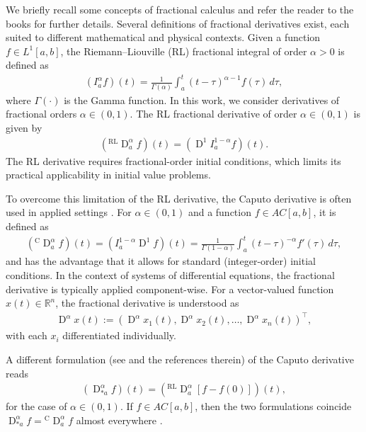 \documentclass{svproc}
\newcommand{\RLderivativeInput}[2]{{}^\mathrm{RL}\operatorname{D}_{#2}^{#1}}
\newcommand{\CderivativeInput}[2]{{}^\mathrm{C}\operatorname{D}_{#2}^{#1}}
\newcommand{\AstderivativeInput}[2]{\operatorname{D}_{\ast #2}^{#1}}
\begin{document}
	{%
		We briefly recall some concepts of fractional calculus and refer the reader to the books \cite{Diethelm2010,Kilbas2006} for further details. Several definitions of fractional derivatives exist, each suited to different mathematical and physical contexts. Given a function $f \in L^1[a,b]$, the Riemann--Liouville (RL) fractional integral of order $\alpha > 0$ is defined as
		\begin{align}
			(I_{a}^\alpha f)(t) = \frac{1}{\Gamma(\alpha)} \int_a^t (t - \tau)^{\alpha - 1} f(\tau)\,d\tau,
		\end{align}
		where $\Gamma(\cdot)$ is the Gamma function. { In this work, we consider derivatives of fractional orders $\alpha \in (0,1)$.} The RL fractional derivative of order $\alpha \in (0,1)$ is given by
		\begin{align}
			\left(\RLderivativeInput{\alpha}{a} f\right)(t) = \left(\operatorname D ^1 {I_{a}^{1 - \alpha}} f\right)(t).
		\end{align} The RL derivative requires fractional-order initial conditions, which limits its practical applicability in initial value problems.
		
		To overcome this limitation of the RL derivative, the Caputo derivative is often used in applied settings \cite{Hinze2020,Rand2010,Daibiri2015}. For $\alpha \in (0, 1)$  and a function $f \in AC[a,b]$, it is defined as
		\begin{align}
			\left(\CderivativeInput{\alpha}{a} f\right)(t) = \left( {I_{a}^{1 - \alpha}}\operatorname D ^1 f\right)(t)= \frac{1}{\Gamma(1 - \alpha)} \int_a^t (t - \tau)^{ - \alpha} f'(\tau)\,d\tau,
		\end{align}
		and has the advantage that it allows for standard (integer-order) initial conditions. In the context of systems of differential equations, the fractional derivative is typically applied component-wise. For a vector-valued function $x(t) \in \mathbb{R}^n$, the fractional derivative is understood as
		\begin{align}
			\operatorname D^\alpha x(t) := \left(\operatorname D^\alpha x_1(t), \operatorname D^\alpha x_2(t), \dots, \operatorname D^\alpha x_n(t)\right)^\top,
		\end{align}
		with each $x_i$ differentiated individually.

        { A different formulation (see \cite{Diethelm2010} and the references therein) of the Caputo derivative reads
        \begin{align}
            \left(\AstderivativeInput{\alpha}{a} f\right)(t) = \left(\RLderivativeInput{\alpha}{a} [f-f(0)]\right)(t),
        \end{align} for the case of $\alpha \in (0,1)$. If $f\in AC[a,b]$, then the two formulations coincide $\AstderivativeInput{\alpha}{a}f = \CderivativeInput{\alpha}{a}f$ almost everywhere \cite{Diethelm2010}.}
		
}
\end{document}
